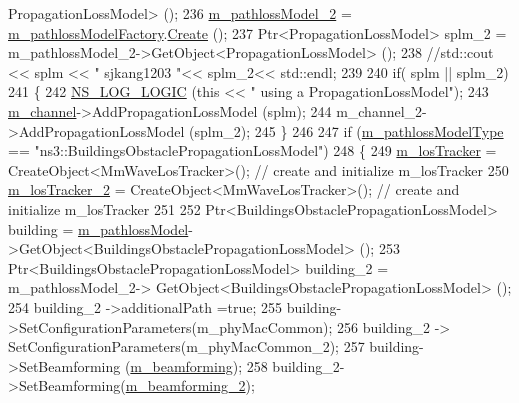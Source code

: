 \begin{DoxyCode}
      PropagationLossModel> ();
236                         \hyperlink{classns3_1_1MmWaveHelper_a463070ab19ee9776262439eda4edf3e2}{m\_pathlossModel\_2} = 
      \hyperlink{classns3_1_1MmWaveHelper_a11109a98a7fe9fb7e0c63e891dd50e3c}{m\_pathlossModelFactory}.\hyperlink{classns3_1_1ObjectFactory_a18152e93f0a6fe184ed7300cb31e9896}{Create} ();
237                 Ptr<PropagationLossModel> splm\_2 = m\_pathlossModel\_2->GetObject<PropagationLossModel> ();
238                 \textcolor{comment}{//std::cout << splm << " sjkang1203 "<< splm\_2<< std::endl;}
239 
240                 \textcolor{keywordflow}{if}( splm || splm\_2)
241                 \{
242                         \hyperlink{group__logging_ga88acd260151caf2db9c0fc84997f45ce}{NS\_LOG\_LOGIC} (\textcolor{keyword}{this} << \textcolor{stringliteral}{" using a PropagationLossModel"});
243                         \hyperlink{classns3_1_1MmWaveHelper_adac6d83bc2acef8b7dbd9fc668207d95}{m\_channel}->AddPropagationLossModel (splm);
244                         m\_channel\_2->AddPropagationLossModel (splm\_2);
245                 \}
246 
247                 \textcolor{keywordflow}{if} (\hyperlink{classns3_1_1MmWaveHelper_a7f17e9bc4797b51d9a31d16c7e667960}{m\_pathlossModelType} == \textcolor{stringliteral}{"ns3::BuildingsObstaclePropagationLossModel"})
248                 \{
249                         \hyperlink{classns3_1_1MmWaveHelper_af8d5d3767371b17c144a0bea7e92af44}{m\_losTracker} = CreateObject<MmWaveLosTracker>(); \textcolor{comment}{// create and
       initialize m\_losTracker}
250                         \hyperlink{classns3_1_1MmWaveHelper_a69ccf3ffeee48b44244b478aba4eba18}{m\_losTracker\_2} = CreateObject<MmWaveLosTracker>(); \textcolor{comment}{// create and
       initialize m\_losTracker}
251 
252                         Ptr<BuildingsObstaclePropagationLossModel> building = 
      \hyperlink{classns3_1_1MmWaveHelper_a4de60027f5a256fe51033e6d6803e9b0}{m\_pathlossModel}->GetObject<BuildingsObstaclePropagationLossModel> ();
253                         Ptr<BuildingsObstaclePropagationLossModel> building\_2 = m\_pathlossModel\_2->
      GetObject<BuildingsObstaclePropagationLossModel> ();
254                         building\_2 ->additionalPath =\textcolor{keyword}{true};
255                         building->SetConfigurationParameters(m\_phyMacCommon);
256                         building\_2 -> SetConfigurationParameters(m\_phyMacCommon\_2);
257                         building->SetBeamforming (\hyperlink{classns3_1_1MmWaveHelper_a4fa071b6d755f32a684906150660b381}{m\_beamforming});
258                         building\_2->SetBeamforming(\hyperlink{classns3_1_1MmWaveHelper_a3406a28781481686589a5275787bf43f}{m\_beamforming\_2});

\end{DoxyCode}
